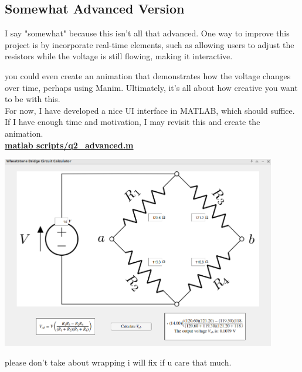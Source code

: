 \documentclass[a4paper, 12pt]{report}
\def\link{blue!50!black}
\begin{document}
    
    
    \newpage
    \subsection{Somewhat Advanced Version}
    I say "somewhat" because this isn't all that advanced. One way to improve this project is by incorporate real-time elements, such as allowing users to adjust the resistors while the voltage is still flowing, making it interactive.
    
    you could even create an animation that demonstrates how the voltage changes over time, perhaps using Manim. Ultimately, it’s all about how creative you want to be with this.\\[1em]
    
    For now, I have developed a nice UI interface in MATLAB, which should suffice. If I have enough time and motivation, I may revisit this and create the animation.\\
    \vspace{1em}
    \href{https://github.com/sakx7/mathcompuni/blob/main/matlab scripts/q2_advanced.m}{\textcolor{\link}{\textbf{matlab scripts/q2\_advanced.m}}}\\[1em]
    
    \begin{center}
        \includegraphics[width=0.9\textwidth]{images/realwheat.png}
    \end{center}
    please don't take about wrapping i will fix if u care that much.
\end{document}
